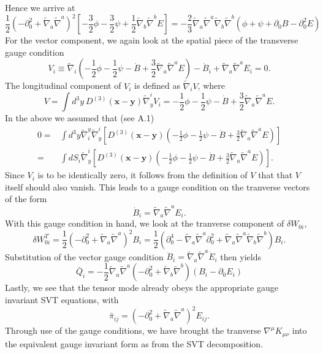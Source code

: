 \documentclass[10pt,letterpaper]{article}
\numberwithin{equation}{subsection}
\begin{document}
Hence we arrive at
\begin{equation}
\frac12 \left(-\partial_0^2+\tilde\nabla_a\tilde\nabla^a\right)^2
\left[ -\frac32 \phi - \frac32\psi  +\frac12 \tilde\nabla_b\tilde\nabla^b E \right]=-\frac{2}{3}\tilde\nabla_a\tilde\nabla^a \tilde\nabla_b\tilde\nabla^b\left( \phi + \psi +\partial_0 B - \partial_0^2 E\right)
\end{equation}
For the vector component, we again look at the spatial piece of the transverse gauge condition
\begin{equation}
V_i \equiv  \tilde\nabla_i\left( -\frac12 \phi - \frac12 \psi - \dot B + \frac32  \tilde\nabla_a\tilde\nabla^a E\right) - \dot B_i +  \tilde\nabla_a\tilde\nabla^a E_i = 0.
\end{equation}
The longitudinal component of $V_i$ is defined as $\tilde\nabla_i V$, where
\begin{equation}
V = \int d^3y\ D^{(3)}(\mathbf x - \mathbf y)\tilde\nabla_y^i V_i = -\frac12 \phi - \frac12 \psi - \dot B + \frac32  \tilde\nabla_a\tilde\nabla^a E.
\end{equation}
In the above we assumed that (see A.1)
\begin{align}
0=&{}\int d^3y \tilde\nabla_i^y \tilde\nabla^i_y \left[ D^{(3)}(\mathbf x - \mathbf y) \left( -\frac12 \phi - \frac12 \psi - \dot B + \frac32  \tilde\nabla_a\tilde\nabla^a E\right)\right] 
\nonumber\\
=&{} \int dS_i \tilde\nabla^i_y \left[ D^{(3)}(\mathbf x - \mathbf y) \left( -\frac12 \phi - \frac12 \psi - \dot B + \frac32  \tilde\nabla_a\tilde\nabla^a E\right) \right]. 
\end{align}
Since $V_i$ is to be identically zero, it follows from the definition of $V$ that that $V$ itself should also vanish. This leads to a gauge condition on the tranverse vectors of the form
\begin{equation}
\dot B_i = \tilde\nabla_a \tilde\nabla^a E_i.
\end{equation}
With this gauge condition in hand, we look at the tranverse component of $\delta W_{0i}$,
\begin{equation}
\delta W_{0i}^T= \frac12\left( - \partial_0^2 +  \tilde\nabla_a\tilde\nabla^a\right)^2 B_i = \frac{1}{2}\left( \partial_0^4 - \tilde\nabla_a\tilde\nabla^a \partial_0^2
+ \tilde\nabla_a\tilde\nabla^a\tilde\nabla_b\tilde\nabla^b\right) B_i.
\end{equation}
Substitution of the vector gauge condition $\ddot B_i =\tilde\nabla_a \tilde\nabla^a\dot E_i$ then yields
\begin{equation}
\boxed{
\bar Q_i=-\frac{1}{2} \tilde{\nabla}_a\tilde{\nabla}^a\left(-\partial_0^2+\tilde{\nabla}_b\tilde{\nabla}^b\right)(B_i - \partial_0{E}_i)}
\end{equation}
Lastly, we see that the tensor mode already obeys the appropriate gauge invariant SVT equations, with
\begin{equation}
\boxed{
\bar\pi_{ij} =  \left(-\partial_0^2 + \tilde\nabla_a\tilde\nabla^a\right)^2 E_{ij}}.
\end{equation}
Through use of the gauge conditions, we have brought the tranverse $\nabla^\mu K_{\mu\nu}$ into the equivalent gauge invariant form as from the SVT decomposition.
\end{document}

